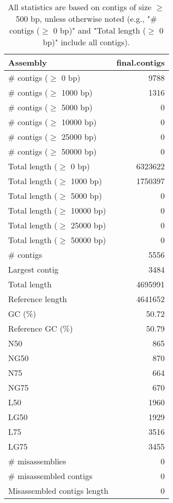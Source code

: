 \documentclass[12pt,a4paper]{article}
\begin{document}
\begin{table}[ht]
\begin{center}
\caption{All statistics are based on contigs of size $\geq$ 500 bp, unless otherwise noted (e.g., "\# contigs ($\geq$ 0 bp)" and "Total length ($\geq$ 0 bp)" include all contigs).}
\begin{tabular}{|l*{1}{|r}|}
\hline
Assembly & final.contigs \\ \hline
\# contigs ($\geq$ 0 bp) & 9788 \\ \hline
\# contigs ($\geq$ 1000 bp) & 1316 \\ \hline
\# contigs ($\geq$ 5000 bp) & 0 \\ \hline
\# contigs ($\geq$ 10000 bp) & 0 \\ \hline
\# contigs ($\geq$ 25000 bp) & 0 \\ \hline
\# contigs ($\geq$ 50000 bp) & 0 \\ \hline
Total length ($\geq$ 0 bp) & 6323622 \\ \hline
Total length ($\geq$ 1000 bp) & 1750397 \\ \hline
Total length ($\geq$ 5000 bp) & 0 \\ \hline
Total length ($\geq$ 10000 bp) & 0 \\ \hline
Total length ($\geq$ 25000 bp) & 0 \\ \hline
Total length ($\geq$ 50000 bp) & 0 \\ \hline
\# contigs & 5556 \\ \hline
Largest contig & 3484 \\ \hline
Total length & 4695991 \\ \hline
Reference length & 4641652 \\ \hline
GC (\%) & 50.72 \\ \hline
Reference GC (\%) & 50.79 \\ \hline
N50 & 865 \\ \hline
NG50 & 870 \\ \hline
N75 & 664 \\ \hline
NG75 & 670 \\ \hline
L50 & 1960 \\ \hline
LG50 & 1929 \\ \hline
L75 & 3516 \\ \hline
LG75 & 3455 \\ \hline
\# misassemblies & 0 \\ \hline
\# misassembled contigs & 0 \\ \hline
Misassembled contigs length & 0 \\ \hline

\end{tabular}
\end{center}
\end{table}
\end{document}
